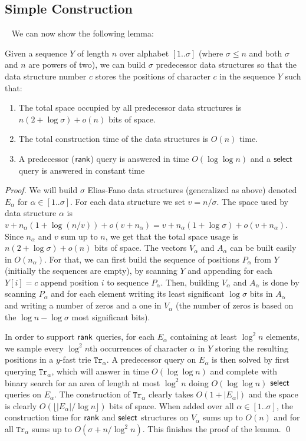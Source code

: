 \documentclass[11pt,runningheads]{llncs}
\def\rank{\mbox{\rm {\sf rank}}}
\def\select{\mbox{\rm {\sf select}}}
\begin{document}
\subsection{Simple Construction}
~\label{sec:simple_Elias_Fano_build}
We can now show the following lemma: 
\begin{lemma}
\label{lemma:simple_Elias_Fano_build}
Given a sequence $Y$ of length $n$ over alphabet $[1..\sigma]$ (where $\sigma\leq n$ and 
both $\sigma$ and $n$ are powers of two), we can build $\sigma$ predecessor data structures 
so that the data structure number $c$ stores the positions of character $c$ in the sequence $Y$ such that: 
\begin{enumerate} 
\item The total space occupied by all predecessor data structures is $n(2+\log\sigma)+o(n)$ bits of space. 
\item The total construction time of the data structures is $O(n)$ time. 
\item A predecessor ($\rank$) query is answered in time $O(\log\log n)$ and 
a $\select$ query is answered in constant time
\end{enumerate}
\end{lemma}
\begin{proof}
We will build $\sigma$ Elias-Fano data structures (generalized as above)
denoted $E_\alpha$ for $\alpha\in [1..\sigma]$. 
For each data structure we set $v=n/\sigma$. The space used by data structure 
$\alpha$ is $v+n_\alpha(1+\log(n/v))+o(v+n_\alpha)=v+n_\alpha(1+\log\sigma)+o(v+n_\alpha)$. 
Since $n_\alpha$ and $v$ sum up to $n$, we get that the total space usage is $n(2+\log\sigma)+o(n)$
bits of space. The vectors $V_\alpha$ and $A_\alpha$ can be built easily in $O(n_\alpha)$. 
For that, we can first build the sequence of positions $P_\alpha$ from $Y$ (initially the sequences 
are empty), by scanning $Y$ and appending for each $Y[i]=c$ append position $i$ to sequence $P_\alpha$. 
Then, building $V_\alpha$ and $A_\alpha$ is done by scanning $P_\alpha$ and for each element 
writing its least significant $\log\sigma$ bits in $A_\alpha$ and writing a number of zeros 
and a one in $V_\alpha$
(the number of zeros is based on the $\log n-\log\sigma$ most significant bits). 

In order to support $\rank$ queries, for each $E_\alpha$ containing at least $\log^2 n$ elements, we sample every $\log^2 n$th occurrences of character $\alpha$ in $Y$ storing the resulting positions in a $y$-fast trie $\mathtt{Tr}_\alpha$. A predecessor query on $E_\alpha$ is then solved by first querying $\mathtt{Tr}_\alpha$, which will answer in time $O(\log \log n)$ and complete with binary search for an area of length at most $\log^2 n$ doing $O(\log\log n)$ $\select$ queries on $E_\alpha$. The construction of $\mathtt{Tr}_\alpha$ clearly takes $O(1+|E_\alpha|)$ and the space is clearly $O(\lfloor|E_\alpha|/\log n \rfloor)$ bits of space. When added over all $\alpha\in[1..\sigma]$, the construction time for $\rank$ and $\select$ structures on $V_\alpha$ sums up to $O(n)$ and for all $\mathtt{Tr}_\alpha$ sums up to $O(\sigma+n/\log^2 n)$. This finishes the proof of the lemma.  
\qed
\end{proof}
\end{document}
